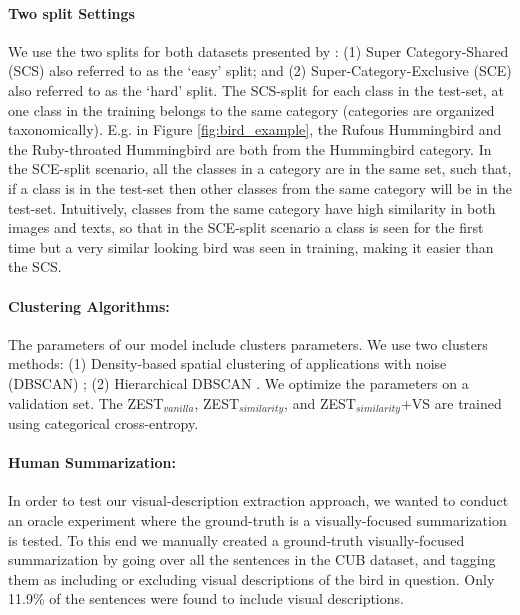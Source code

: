 \documentclass[11pt,a4paper]{article}
\begin{document}
\paragraph{Two split Settings} We use the two splits for both datasets presented by \citet{elhoseiny2017link}: (1) Super Category-Shared (SCS) also referred to as the \enquote*{easy} split; and (2) Super-Category-Exclusive (SCE) also referred to as the \enquote*{hard} split. The SCS-split for each class in the test-set, at one class in the training belongs to the same category (categories are organized taxonomically). E.g. in Figure \ref{fig:bird_example}, the Rufous Hummingbird and the Ruby-throated Hummingbird are both from the Hummingbird category. In the SCE-split scenario, all the classes in a category are in the same set, such that, if a class is in the test-set then other classes from the same category will be in the test-set. Intuitively, classes from the same category have high similarity in both images and texts, so that in the SCE-split scenario a class is seen for the first time but a very similar looking bird was seen in training, making it easier than the SCS.

\paragraph{Clustering Algorithms:}
The parameters of our model include clusters parameters.
We use two clusters methods: (1) Density-based spatial clustering of applications with noise (DBSCAN) \citep{ester1996density}; (2) Hierarchical DBSCAN \citep{mcinnes2017hdbscan}.
We optimize the parameters on a validation set. The ZEST$_{vanilla}$, ZEST$_{similarity}$, and ZEST$_{similarity}$+VS are trained using categorical cross-entropy.

\paragraph{Human Summarization:} 
In order to test our visual-description extraction approach, we wanted to conduct an oracle experiment where the ground-truth is a visually-focused summarization is tested. To this end we manually created a ground-truth visually-focused summarization by going over all the sentences in the CUB dataset, and tagging them as including or excluding visual descriptions of the bird in question. Only 11.9\% of the sentences were found to include visual descriptions.  
\end{document}
